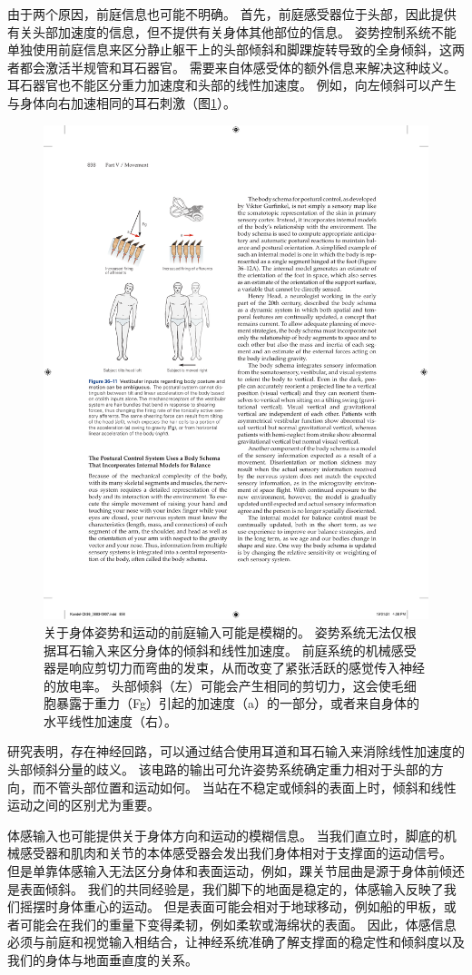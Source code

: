 由于两个原因，前庭信息也可能不明确。 首先，前庭感受器位于头部，因此提供有关头部加速度的信息，但不提供有关身体其他部位的信息。 姿势控制系统不能单独使用前庭信息来区分静止躯干上的头部倾斜和脚踝旋转导致的全身倾斜，这两者都会激活半规管和耳石器官。 需要来自体感受体的额外信息来解决这种歧义。 耳石器官也不能区分重力加速度和头部的线性加速度。 
例如，向左倾斜可以产生与身体向右加速相同的耳石刺激（图\ref{fig:36_11}）。

\begin{figure}[htbp]
	\centering
	\includegraphics[width=0.45\linewidth]{chap36/fig_36_11}
	\caption{关于身体姿势和运动的前庭输入可能是模糊的。 姿势系统无法仅根据耳石输入来区分身体的倾斜和线性加速度。 前庭系统的机械感受器是响应剪切力而弯曲的发束，从而改变了紧张活跃的感觉传入神经的放电率。 头部倾斜（左）可能会产生相同的剪切力，这会使毛细胞暴露于重力（Fg）引起的加速度（a）的一部分，或者来自身体的水平线性加速度（右）。}
	\label{fig:36_11}
\end{figure}

研究表明，存在神经回路，可以通过结合使用耳道和耳石输入来消除线性加速度的头部倾斜分量的歧义。 该电路的输出可允许姿势系统确定重力相对于头部的方向，而不管头部位置和运动如何。 当站在不稳定或倾斜的表面上时，倾斜和线性运动之间的区别尤为重要。

体感输入也可能提供关于身体方向和运动的模糊信息。 当我们直立时，脚底的机械感受器和肌肉和关节的本体感受器会发出我们身体相对于支撑面的运动信号。 但是单靠体感输入无法区分身体和表面运动，例如，踝关节屈曲是源于身体前倾还是表面倾斜。 我们的共同经验是，我们脚下的地面是稳定的，体感输入反映了我们摇摆时身体重心的运动。 但是表面可能会相对于地球移动，例如船的甲板，或者可能会在我们的重量下变得柔韧，例如柔软或海绵状的表面。 因此，体感信息必须与前庭和视觉输入相结合，让神经系统准确了解支撑面的稳定性和倾斜度以及我们的身体与地面垂直度的关系。


